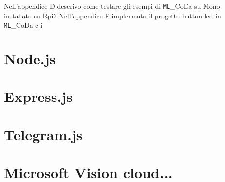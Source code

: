  
 Nell'appendice D descrivo come testare gli esempi di \texttt{ML}_{CoDa} su Mono installato su Rpi3
 Nell'appendice E implemento il progetto button-led in \texttt{ML}_{CoDa} e i
\section{Node.js}

\section{Express.js}

\section{Telegram.js}

\section{Microsoft Vision cloud...} 

